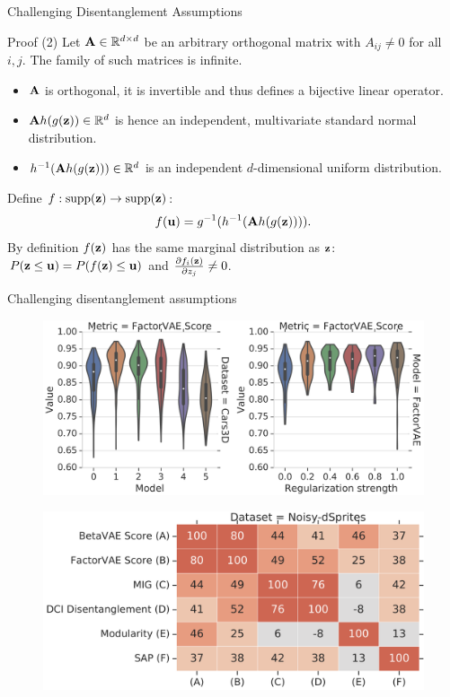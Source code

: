 \begin{frame}{Challenging Disentanglement Assumptions}
\begin{block}{Proof (2)}
	Let $\mathbf{A} \in \mathbb{R}^{d \times d}$ be an arbitrary orthogonal matrix with $A_{ij} \neq 0$ for all $i, j$.
	The family of such matrices is infinite.
	\begin{itemize}
		\item $\mathbf{A}$ is orthogonal, it is invertible and thus defines a bijective linear operator. 
		\item $\mathbf{A} h(g(\mathbf{z})) \in \mathbb{R}^d$ is hence an independent, multivariate standard normal distribution.
		\item $h^{-1}( \mathbf{A} h(g(\mathbf{z}))) \in \mathbb{R}^d$ is an independent $d$-dimensional uniform distribution.
	\end{itemize}
	Define $f: \text{supp}(\mathbf{z}) \rightarrow \text{supp}(\mathbf{z})$:
	\vspace{-0.2cm}
	\[
	f(\mathbf{u}) = g^{-1} (h^{-1}( \mathbf{A} h(g(\mathbf{z})))).
	\]
	By definition $f(\mathbf{z})$ has the same marginal distribution as $\mathbf{z}$: $P(\mathbf{z} \leq \mathbf{u}) = P(f(\mathbf{z}) \leq \mathbf{u})$ and $\frac{\partial f_i(\mathbf{z})}{\partial z_j} \neq 0$.
\end{block}

\end{frame}
\begin{frame}{Challenging disentanglement assumptions}
	\begin{figure}
		\centering
		\includegraphics[width=0.85\linewidth]{figs/challenge_dis_2}
	\end{figure}
	\vspace{-0.3cm}
	\begin{figure}
		\centering
		\includegraphics[width=0.65\linewidth]{figs/challenge_dis_3}
	\end{figure}

\end{frame}
